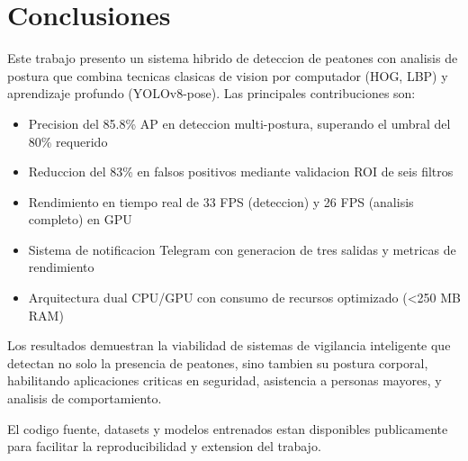 \documentclass[conference]{IEEEtran}
\begin{document}
\section{Conclusiones}

Este trabajo presento un sistema hibrido de deteccion de peatones con analisis de postura que combina tecnicas clasicas de vision por computador (HOG, LBP) y aprendizaje profundo (YOLOv8-pose). Las principales contribuciones son:

\begin{itemize}
    \item Precision del 85.8\% AP en deteccion multi-postura, superando el umbral del 80\% requerido
    \item Reduccion del 83\% en falsos positivos mediante validacion ROI de seis filtros
    \item Rendimiento en tiempo real de 33 FPS (deteccion) y 26 FPS (analisis completo) en GPU
    \item Sistema de notificacion Telegram con generacion de tres salidas y metricas de rendimiento
    \item Arquitectura dual CPU/GPU con consumo de recursos optimizado (<250 MB RAM)
\end{itemize}

Los resultados demuestran la viabilidad de sistemas de vigilancia inteligente que detectan no solo la presencia de peatones, sino tambien su postura corporal, habilitando aplicaciones criticas en seguridad, asistencia a personas mayores, y analisis de comportamiento.

El codigo fuente, datasets y modelos entrenados estan disponibles publicamente para facilitar la reproducibilidad y extension del trabajo.
\end{document}
